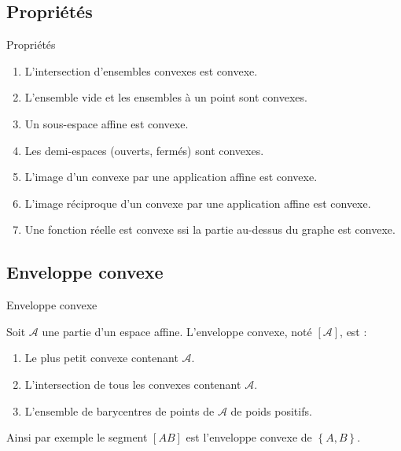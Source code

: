 \documentclass[
bigger]{m53beamer}
\begin{document}
\subsection{Propriétés}
\begin{frame}{Propriétés}
  \begin{enumerate}[<+(1)->]
    \item L'intersection d'ensembles convexes est convexe.
    \item L'ensemble vide et les ensembles à un point sont convexes.
    \item Un sous-espace affine est convexe.
    \item Les demi-espaces (ouverts, fermés) sont convexes.
    \item L'image d'un convexe par une application affine est convexe.
    \item L'image réciproque d'un convexe par une application affine est convexe.
    \item Une fonction réelle est convexe ssi la partie au-dessus du graphe est convexe.
  \end{enumerate}
\end{frame}

\subsection{Enveloppe convexe}
\begin{frame}{Enveloppe convexe}
  \begin{defprop}
    Soit $\mathcal{A}$ une partie d'un espace affine. L'enveloppe convexe, noté $[\mathcal{A}]$, est :
    \begin{enumerate}[<+(1)->]
      \item Le plus petit convexe contenant $\mathcal{A}$.
      \item L'intersection de tous les convexes contenant $\mathcal{A}$.
      \item L'ensemble de barycentres de points de $\mathcal{A}$ de poids positifs.
    \end{enumerate}
  \end{defprop}\pause
    Ainsi par exemple le segment $[AB]$ est l'enveloppe convexe de $\left\{A,B\right\}$.
\end{frame}
\end{document}
